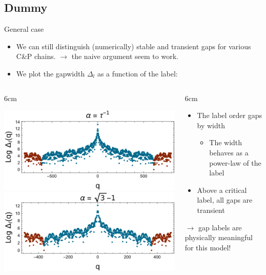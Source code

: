\documentclass[xcolor=x11names,compress,professionalfonts]{beamer}
\renewcommand{\(}{\begin{columns}}
\renewcommand{\)}{\end{columns}}
\newcommand{\<}[1]{\begin{column}{#1}}
\renewcommand{\>}{\end{column}}
\begin{document}
\subsection{Dummy}
\begin{frame}{General case}
\begin{itemize}
	\item We can still distinguish (numerically) stable and transient gaps for various C\&P chains.
$\rightarrow$ the naive argument seem to work.
	\item We plot the gapwidth $\Delta_l$ as a function of the label:
\end{itemize}

\(
\<{6cm}
{\centering
\newcommand{\s}{.45}
\includegraphics[scale=\s]{img/loggapwidth_fibonacci_l_17.pdf}\\
\includegraphics[scale=\s]{img/loggapwidth_sqrt3_l_12.pdf}

}
\>
\<{6cm}
\begin{itemize}
	\item The label order gaps by width
	\begin{itemize}
		\item The width behaves as a power-law of the label
	\end{itemize}
	\item Above a critical label, all gaps are transient
\end{itemize}
$\rightarrow$ gap labels are physically meaningful for this model!
\>
\)
	
\end{frame}
\end{document}
